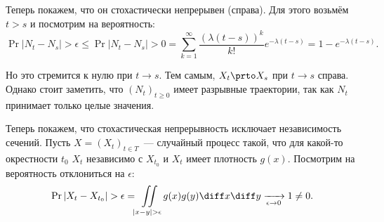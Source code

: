 Теперь покажем, что он стохастически непрерывен (справа). Для этого возьмём \(t 
> s\) и посмотрим на вероятность:
\[
	\Pr{|N_{t} - N_{s}| > \epsilon} \leq \Pr{|N_{t} - N_{s}| > 0} = \sum_{k = 
	1}^{\infty} \frac{(\lambda(t - s))^{k}}{k!}e^{-\lambda(t - s)} = 1 - 
	e^{-\lambda(t - s)}.
\]

Но это стремится к нулю при \(t \to s\). Тем самым, \(X_{t} \prto X_{s}\) при 
\(t \to s\) справа. Однако стоит заметить, что \((N_{t})_{t \geq 0}\) имеет 
разрывные траектории, так как \(N_{t}\) принимает только целые значения.

Теперь покажем, что стохастическая непрерывность исключает независимость 
сечений. Пусть \(X = (X_{t})_{t \in T}\)~--- случайный процесс такой, что для 
какой-то окрестности \(t_{0}\) \(X_{t}\) независимо с \(X_{t_{0}}\) и \(X_{t}\) 
имеет плотность \(g(x)\). Посмотрим на вероятность отклониться на \(\epsilon\):
\[
	\Pr{|X_{t} - X_{t_{0}}| > \epsilon} = \iint\limits_{|x - y| > \epsilon} 
	g(x)g(y)\diff x \diff y \xrightarrow[\epsilon \to 0]{} 1 \neq 0.
\]